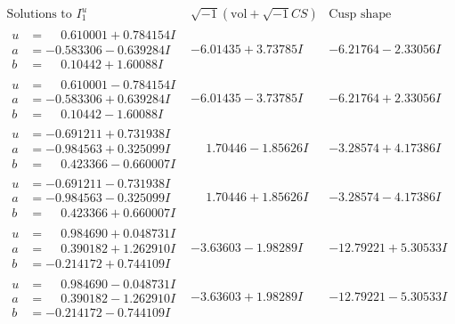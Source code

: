 \documentclass[1p]{elsarticle_modified}
\theoremstyle{definition}
\newcommand{\I}{\sqrt{-1}}
\begin{document}
$$\begin{array}{c|c|c}  
\text{Solutions to }I^u_{1}& \I (\text{vol} + \sqrt{-1}CS) & \text{Cusp shape}\\
 \hline 
\begin{aligned}
u &= \phantom{-}0.610001 + 0.784154 I \\
a &= -0.583306 - 0.639284 I \\
b &= \phantom{-}0.10442 + 1.60088 I\end{aligned}
 & -6.01435 + 3.73785 I & -6.21764 - 2.33056 I \\ \hline\begin{aligned}
u &= \phantom{-}0.610001 - 0.784154 I \\
a &= -0.583306 + 0.639284 I \\
b &= \phantom{-}0.10442 - 1.60088 I\end{aligned}
 & -6.01435 - 3.73785 I & -6.21764 + 2.33056 I \\ \hline\begin{aligned}
u &= -0.691211 + 0.731938 I \\
a &= -0.984563 + 0.325099 I \\
b &= \phantom{-}0.423366 - 0.660007 I\end{aligned}
 & \phantom{-}1.70446 - 1.85626 I & -3.28574 + 4.17386 I \\ \hline\begin{aligned}
u &= -0.691211 - 0.731938 I \\
a &= -0.984563 - 0.325099 I \\
b &= \phantom{-}0.423366 + 0.660007 I\end{aligned}
 & \phantom{-}1.70446 + 1.85626 I & -3.28574 - 4.17386 I \\ \hline\begin{aligned}
u &= \phantom{-}0.984690 + 0.048731 I \\
a &= \phantom{-}0.390182 + 1.262910 I \\
b &= -0.214172 + 0.744109 I\end{aligned}
 & -3.63603 - 1.98289 I & -12.79221 + 5.30533 I \\ \hline\begin{aligned}
u &= \phantom{-}0.984690 - 0.048731 I \\
a &= \phantom{-}0.390182 - 1.262910 I \\
b &= -0.214172 - 0.744109 I\end{aligned}
 & -3.63603 + 1.98289 I & -12.79221 - 5.30533 I \\ \hline\begin{aligned}

\end{aligned}
\end{array}$$
\end{document}
